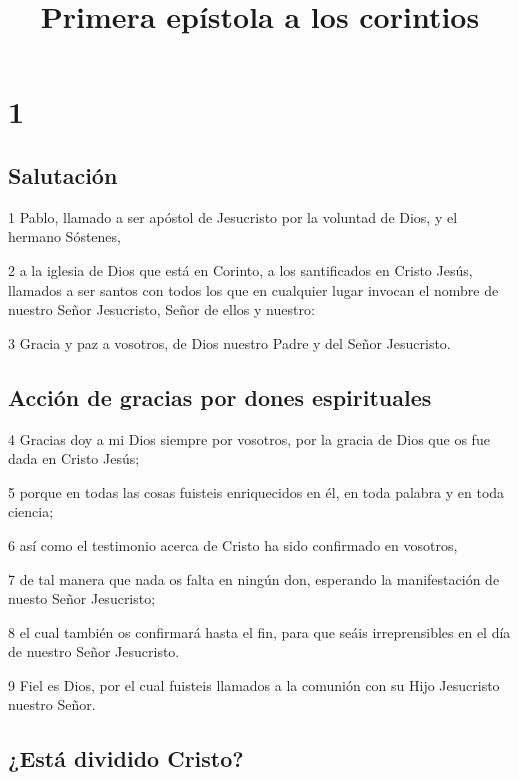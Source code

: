 
\title{Primera epístola a los corintios}

\chapter{1}

\section*{Salutación}

\par 1 Pablo, llamado a ser apóstol de Jesucristo por la voluntad de Dios, y el hermano Sóstenes,
\par 2 a la iglesia de Dios que está en Corinto, a los santificados en Cristo Jesús, llamados a ser santos con todos los que en cualquier lugar invocan el nombre de nuestro Señor Jesucristo, Señor de ellos y nuestro:
\par 3 Gracia y paz a vosotros, de Dios nuestro Padre y del Señor Jesucristo.

\section*{Acción de gracias por dones espirituales}

\par 4 Gracias doy a mi Dios siempre por vosotros, por la gracia de Dios que os fue dada en Cristo Jesús;
\par 5 porque en todas las cosas fuisteis enriquecidos en él, en toda palabra y en toda ciencia;
\par 6 así como el testimonio acerca de Cristo ha sido confirmado en vosotros,
\par 7 de tal manera que nada os falta en ningún don, esperando la manifestación de nuesto Señor Jesucristo;
\par 8 el cual también os confirmará hasta el fin, para que seáis irreprensibles en el día de nuestro Señor Jesucristo.
\par 9 Fiel es Dios, por el cual fuisteis llamados a la comunión con su Hijo Jesucristo nuestro Señor.

\section*{¿Está dividido Cristo?}

